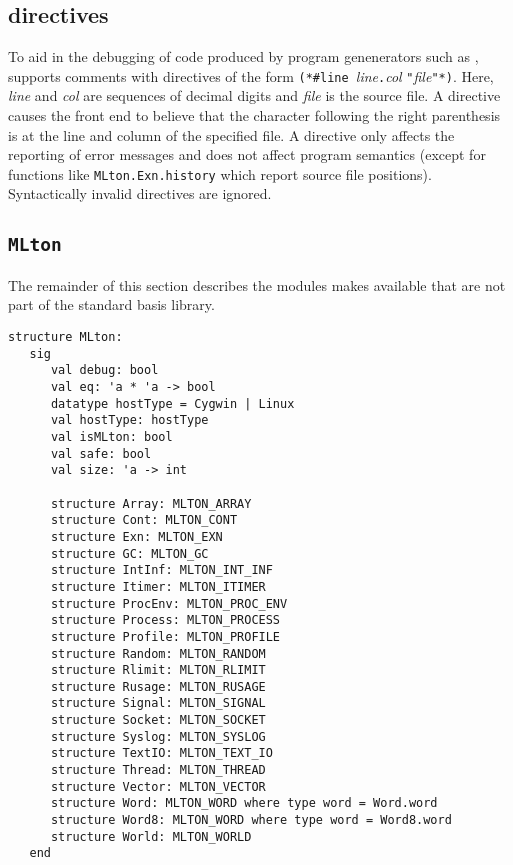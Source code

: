 
\subsection{{\nline} directives}
To aid in the debugging of code produced by program genenerators such as
,
{\mlton} supports comments with {\nline} directives of the form {\tt (*\#line
}{\it line}{\tt.}{\it col} {\tt "}{\it file}{\tt"*)}.  Here, {\it line} and {\it
col} are sequences of decimal digits and {\it file} is the source file.  A
{\nline} directive causes the front end to believe that the character following
the right parenthesis is at the line and column of the specified file.  A
{\nline} directive only affects the reporting of error messages and does not
affect program semantics (except for functions like {\tt MLton.Exn.history}
which report source file positions).  Syntactically invalid {\nline} directives
are ignored.

\subsection{{\tt MLton}}

The remainder of this section describes the modules {\mlton} makes available
that are not part of the standard basis library.

\begin{verbatim}
structure MLton:
   sig
      val debug: bool
      val eq: 'a * 'a -> bool
      datatype hostType = Cygwin | Linux
      val hostType: hostType
      val isMLton: bool
      val safe: bool
      val size: 'a -> int

      structure Array: MLTON_ARRAY
      structure Cont: MLTON_CONT
      structure Exn: MLTON_EXN
      structure GC: MLTON_GC
      structure IntInf: MLTON_INT_INF
      structure Itimer: MLTON_ITIMER
      structure ProcEnv: MLTON_PROC_ENV
      structure Process: MLTON_PROCESS
      structure Profile: MLTON_PROFILE
      structure Random: MLTON_RANDOM
      structure Rlimit: MLTON_RLIMIT
      structure Rusage: MLTON_RUSAGE
      structure Signal: MLTON_SIGNAL
      structure Socket: MLTON_SOCKET
      structure Syslog: MLTON_SYSLOG
      structure TextIO: MLTON_TEXT_IO
      structure Thread: MLTON_THREAD
      structure Vector: MLTON_VECTOR
      structure Word: MLTON_WORD where type word = Word.word
      structure Word8: MLTON_WORD where type word = Word8.word
      structure World: MLTON_WORLD
   end
\end{verbatim}

